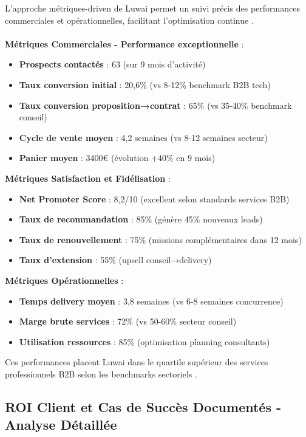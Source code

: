 L'approche métriques-driven de Luwai permet un suivi précis des performances commerciales et opérationnelles, facilitant l'optimisation continue \cite{luwai2025kpis}.
\\\\
\textbf{Métriques Commerciales - Performance exceptionnelle} :
\begin{itemize}
    \item \textbf{Prospects contactés} : 63 (sur 9 mois d'activité)
    \item \textbf{Taux conversion initial} : 20,6\% (vs 8-12\% benchmark B2B tech)
    \item \textbf{Taux conversion proposition→contrat} : 65\% (vs 35-40\% benchmark conseil)
    \item \textbf{Cycle de vente moyen} : 4,2 semaines (vs 8-12 semaines secteur)
    \item \textbf{Panier moyen} : 3400€ (évolution +40\% en 9 mois)
\end{itemize}
\medskip
\textbf{Métriques Satisfaction et Fidélisation} :
\begin{itemize}
    \item \textbf{Net Promoter Score} : 8,2/10 (excellent selon standards services B2B)
    \item \textbf{Taux de recommandation} : 85\% (génère 45\% nouveaux leads)
    \item \textbf{Taux de renouvellement} : 75\% (missions complémentaires dans 12 mois)
    \item \textbf{Taux d'extension} : 55\% (upsell conseil→delivery)
\end{itemize}
\medskip
\textbf{Métriques Opérationnelles} :
\begin{itemize}
    \item \textbf{Temps delivery moyen} : 3,8 semaines (vs 6-8 semaines concurrence)
    \item \textbf{Marge brute services} : 72\% (vs 50-60\% secteur conseil)
    \item \textbf{Utilisation ressources} : 85\% (optimisation planning consultants)
\end{itemize}
\medskip
Ces performances placent Luwai dans le quartile supérieur des services professionnels B2B selon les benchmarks sectoriels \cite{professional_services2024benchmarks}.

\subsection{ROI Client et Cas de Succès Documentés - Analyse Détaillée}

